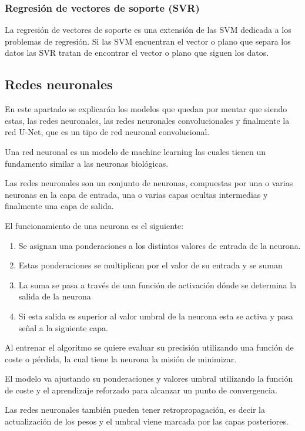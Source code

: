 \subsubsection{Regresión de vectores de soporte (SVR)}
La regresión de vectores de soporte es una extensión de las SVM dedicada a los problemas de regresión. Si las SVM encuentran el vector o plano que separa los datos las SVR tratan de encontrar el vector o plano que siguen los datos.


\subsection{Redes neuronales}
En este apartado se explicarán los modelos que quedan por mentar que siendo estas, las redes neuronales, las redes neuronales convolucionales y finalmente la red U-Net, que es un tipo de red neuronal convolucional. 

Una red neuronal \cite{ibmQuNeuronal} es un modelo de machine learning las cuales tienen un fundamento similar a las neuronas biológicas.

Las redes neuronales son un conjunto de neuronas, compuestas por una o varias neuronas en la capa de entrada, una o varias capas ocultas intermedias y finalmente una capa de salida. 

El funcionamiento de una neurona es el siguiente:
\begin{enumerate}
	\item Se asignan una ponderaciones a los distintos valores de entrada de la neurona.
	
	\item Estas ponderaciones se multiplican por el valor de su entrada y se suman
	
	\item La suma se pasa a través de una función de activación dónde se determina la salida de la neurona
	
	\item Si esta salida es superior al valor umbral de la neurona esta se activa y pasa señal a la siguiente capa.
	
\end{enumerate}
Al entrenar el algoritmo se quiere evaluar su precisión utilizando una función de coste o pérdida, la cual tiene la neurona la misión de minimizar.

El modelo va ajustando su ponderaciones y valores umbral utilizando la función de coste y el aprendizaje reforzado para alcanzar un punto de convergencia.

Las redes neuronales también pueden tener retropropagación, es decir la actualización de los pesos y el umbral viene marcada por las capas posteriores.

